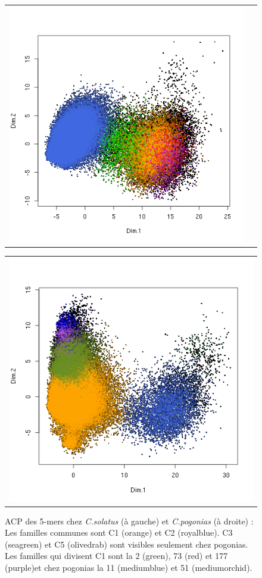 \documentclass[12pt,a4paper]{article}
\begin{document}
\begin{figure}	
\begin{tabular}{cc}
\includegraphics[scale=0.5]{img/Cso_acp_pm090_rapport.png}
\end{tabular}
\hfill
\begin{tabular}{c}
\includegraphics[scale=0.5]{img/Cp_acp_pm090_rapport.png}
\end{tabular}
\caption{ACP des 5-mers chez \textit{C.solatus} (à gauche) et \textit{C.pogonias} (à droite) : Les familles communes sont C1 (orange) et C2 (royalblue).  C3 (seagreen) et C5 (olivedrab) sont visibles seulement chez pogonias. Les familles qui divisent C1 sont la 2 (green), 73 (red) et 177 (purple)et chez pogonias la 11 (mediumblue) et 51 (mediumorchid).} 
\end{figure}
\end{document}
